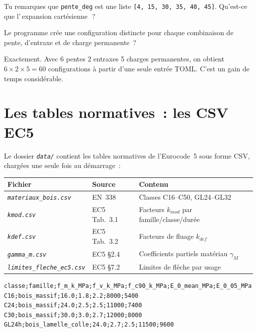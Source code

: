 \documentclass[12pt, a4paper, openany]{book}
\newcommand{\py}[1]{\texttt{#1}}
\newcommand{\fichier}[1]{\texttt{\textit{#1}}}
\begin{document}
\begin{maitre}
Tu remarques que \py{pente\_deg} est une liste \py{[4, 15, 30, 35, 40, 45]}.
Qu'est-ce que l'\guillemotleft\,expansion cart\'esienne\,\guillemotright~?
\end{maitre}

\begin{apprenti}
Le programme cr\'ee une configuration distincte pour chaque combinaison
de pente, d'entraxe et de charge permanente~?
\end{apprenti}

\begin{maitre}
Exactement. Avec 6 pentes \texttimes{} 2 entraxes \texttimes{} 5 charges
permanentes, on obtient $6 \times 2 \times 5 = 60$ configurations \`a
partir d'une seule entr\'ee TOML. C'est un gain de temps consid\'erable.
\end{maitre}

\section{Les tables normatives~: les CSV EC5}

Le dossier \fichier{data/} contient les tables normatives de l'Eurocode~5
sous forme CSV, charg\'ees une seule fois au d\'emarrage~:

\begin{center}
\begin{tabular}{lll}
\toprule
\textbf{Fichier} & \textbf{Source} & \textbf{Contenu}\\
\midrule
\fichier{materiaux\_bois.csv} & EN~338 & Classes C16--C50, GL24--GL32\\
\fichier{kmod.csv}     & EC5 Tab.~3.1 & Facteurs $k_{mod}$ par famille/classe/dur\'ee\\
\fichier{kdef.csv}     & EC5 Tab.~3.2 & Facteurs de fluage $k_{def}$\\
\fichier{gamma\_m.csv} & EC5 \S{}2.4  & Coefficients partiels mat\'eriau $\gamma_M$\\
\fichier{limites\_fleche\_ec5.csv} & EC5 \S{}7.2 & Limites de fl\`eche par usage\\
\bottomrule
\end{tabular}
\end{center}

\begin{lstlisting}[style=toml, language={}, caption={Extrait de \fichier{materiaux\_bois.csv} (EN 338)}]
classe;famille;f_m_k_MPa;f_v_k_MPa;f_c90_k_MPa;E_0_mean_MPa;E_0_05_MPa
C16;bois_massif;16.0;1.8;2.2;8000;5400
C24;bois_massif;24.0;2.5;2.5;11000;7400
C30;bois_massif;30.0;3.0;2.7;12000;8000
GL24h;bois_lamelle_colle;24.0;2.7;2.5;11500;9600
\end{lstlisting}
\end{document}
